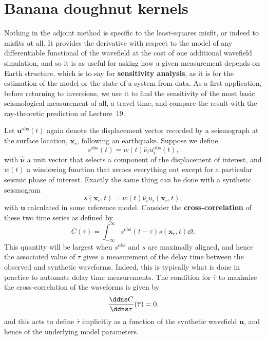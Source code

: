 \section*{Banana doughnut kernels}
Nothing in the adjoint method is specific to the least-squares misfit, or indeed to misfits at all. It provides the 
derivative with respect to the model of any differentiable functional of the wavefield at the cost of one additional 
wavefield simulation, and so it is as useful for asking how a given measurement depends on Earth structure, which is 
to say for \textbf{sensitivity analysis}, as it is for the estimation of the model or the state of a system from data. 
As a first application, before returning to inversions, we use it to find the sensitivity of the most basic seismological 
measurement of all, a travel time, and compare the result with the ray-theoretic prediction of Lecture~19.

Let $\mathbf{u}^{\mathrm{obs}}(t)$ again denote the displacement vector recorded by a seismograph at the surface location, 
$\mathbf{x}_{r}$, following an earthquake. Suppose we define
\begin{equation}
s^{\mathrm{obs}}(t)=w(t)\hat{\nu}_{i}u_{i}^{\mathrm{obs}}(t),
\label{eq:34}
\end{equation}
with $\hat{\bm{\nu}}$ a unit vector that selects a component of the displacement of interest, 
and $w(t)$ a windowing function that zeroes everything out except for a particular seismic phase of interest. Exactly 
the same thing can be done with a synthetic seismogram
\begin{equation}
s(\mathbf{x}_{r},t)=w(t)\hat{\nu}_{i}u_{i}(\mathbf{x}_{r},t),
\label{eq:35}
\end{equation}
with $\mathbf{u}$ calculated in some reference model. Consider 
the \textbf{cross-correlation} of these two time series as defined by
\begin{equation}
C(\tau)=\int_{-\infty}^{\infty}s^{\mathrm{obs}}(t-\tau)s(\mathbf{x}_{r},t)\dd t.
\label{eq:36}
\end{equation}
This quantity will be largest when $s^{\mathrm{obs}}$ and $s$ are maximally aligned, and hence the associated value 
of $\tau$ gives a measurement of the delay time between the observed and synthetic waveforms. Indeed, this 
is typically what is done in practice to automate delay time measurements. The condition for $\overline{\tau}$ 
to maximise the cross-correlation of the waveforms is given by
\begin{equation}
\frac{\ddns C}{\ddns\tau}(\overline{\tau})=0,
\label{eq:37}
\end{equation}
and this acts to define $\overline{\tau}$ implicitly as a function of the synthetic wavefield $\mathbf{u}$, and
 hence of the underlying model parameters. 
 
